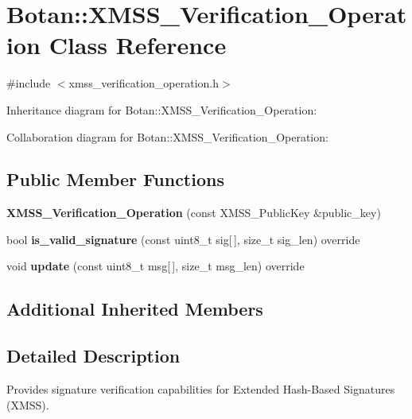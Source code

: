 \hypertarget{class_botan_1_1_x_m_s_s___verification___operation}{}\section{Botan\+:\+:X\+M\+S\+S\+\_\+\+Verification\+\_\+\+Operation Class Reference}
\label{class_botan_1_1_x_m_s_s___verification___operation}


{\ttfamily \#include $<$xmss\+\_\+verification\+\_\+operation.\+h$>$}



Inheritance diagram for Botan\+:\+:X\+M\+S\+S\+\_\+\+Verification\+\_\+\+Operation\+:


Collaboration diagram for Botan\+:\+:X\+M\+S\+S\+\_\+\+Verification\+\_\+\+Operation\+:
\subsection*{Public Member Functions}
\begin{DoxyCompactItemize}
\item 
\mbox{\label{class_botan_1_1_x_m_s_s___verification___operation_a117a1e90b7bca186fe617cd5fab0f6fb}} 
{\bfseries X\+M\+S\+S\+\_\+\+Verification\+\_\+\+Operation} (const X\+M\+S\+S\+\_\+\+Public\+Key \&public\+\_\+key)
\item 
\mbox{\label{class_botan_1_1_x_m_s_s___verification___operation_aa9dc53391eb8fbd0183ccdc1b05e001b}} 
bool {\bfseries is\+\_\+valid\+\_\+signature} (const uint8\+\_\+t sig\mbox{[}$\,$\mbox{]}, size\+\_\+t sig\+\_\+len) override
\item 
\mbox{\label{class_botan_1_1_x_m_s_s___verification___operation_a24a971b3a89d0feb33681cd64767dbe7}} 
void {\bfseries update} (const uint8\+\_\+t msg\mbox{[}$\,$\mbox{]}, size\+\_\+t msg\+\_\+len) override
\end{DoxyCompactItemize}
\subsection*{Additional Inherited Members}


\subsection{Detailed Description}
Provides signature verification capabilities for Extended Hash-\/\+Based Signatures (X\+M\+SS). 

